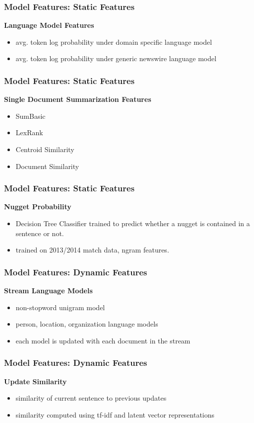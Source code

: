 \documentclass{beamer}
\begin{document}
\begin{frame}
    \frametitle{Model Features: Static Features}
 \textbf{Language Model Features }
 \begin{itemize}
     \item avg. token log probability under domain specific language model
     \item avg. token log probability under generic newswire language model
 \end{itemize}
\end{frame}

\begin{frame}
    \frametitle{Model Features: Static Features}

 \textbf{Single Document Summarization Features } 
    \begin{itemize}
        \item SumBasic
        \item LexRank
        \item Centroid Similarity
        \item Document Similarity 
    \end{itemize}
\end{frame}

\begin{frame}
    \frametitle{Model Features: Static Features}
 \textbf{Nugget Probability} 
    \begin{itemize}
        \item Decision Tree Classifier trained to predict whether a nugget is
            contained in a sentence or not.
        \item trained on 2013/2014 match data, ngram features.
    \end{itemize}

\end{frame}

\begin{frame}
    \frametitle{Model Features: Dynamic Features}
 \textbf{Stream Language Models} 
    \begin{itemize}
        \item non-stopword unigram model
        \item person, location, organization language models
        \item each model is updated with each document in the stream
    \end{itemize}
\end{frame}

\begin{frame}
    \frametitle{Model Features: Dynamic Features}
 \textbf{Update Similarity} 
    \begin{itemize}
        \item similarity of current sentence to previous updates
        \item similarity computed using tf-idf and latent vector 
            representations
    \end{itemize}
\end{frame}
\end{document}
